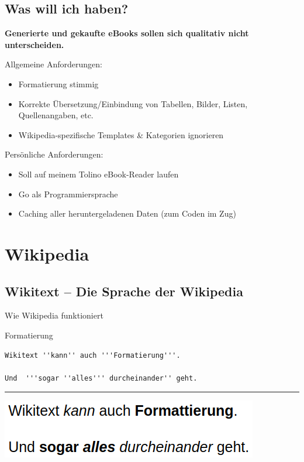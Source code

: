 \documentclass[9pt]{beamer}
\begin{document}
	\subsection{Was will ich haben?}
	\begin{frame}
		\begin{center}
			\textbf{Generierte und gekaufte eBooks sollen sich qualitativ nicht unterscheiden.}
		\end{center}\pause
		Allgemeine Anforderungen:
		\begin{itemize}
			\item Formatierung stimmig
			\item Korrekte Übersetzung/Einbindung von Tabellen, Bilder, Listen, Quellenangaben, etc.
			\item Wikipedia-spezifische Templates \& Kategorien ignorieren
		\end{itemize}\pause\n
		Persönliche Anforderungen:
		\begin{itemize}
			\item Soll auf meinem Tolino eBook-Reader laufen
			\item Go als Programmiersprache
			\item Caching aller heruntergeladenen Daten (zum Coden im Zug)
		\end{itemize}
	\end{frame}

	\section{Wikipedia}	
	
	\subsection{Wikitext -- Die Sprache der Wikipedia}
	
	\begin{frame}
		\vspace{1cm}
		\begin{center}
			Wie Wikipedia funktioniert
		\end{center}
	\end{frame}
	
	\begin{frame}[fragile]{Formatierung}
		\begin{verbatim}
Wikitext ''kann'' auch '''Formatierung'''.

Und  '''sogar ''alles''' durcheinander'' geht.
		\end{verbatim}
		\hrule\n
		\includegraphics[scale=0.35]{images/wikitext-example-0-formatting.png}
	\end{frame}
	
\end{document}
